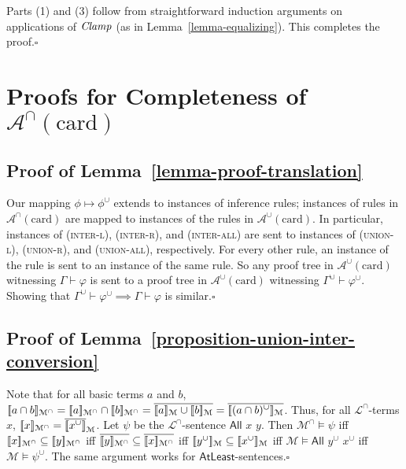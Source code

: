 \documentclass[letterpaper]{article} %
\theoremstyle{definition}
\newcommand{\semantics}[1]{[\![\mbox{\em $ #1 $\/}]\!]}
\newcommand{\Model}{\mathcal{M}}
\newcommand{\proves}{\vdash}
\newcommand{\lang}{\mathcal{L}}
\newcommand{\Aunion}{\mathscr{A}^{\cup}}
\newcommand{\Ainter}{\mathscr{A}^{\cap}}
\newcommand{\proverule}{\textsc}
\newcommand{\unionl}{\proverule{union-l}}
\newcommand{\unionr}{\proverule{union-r}}
\newcommand{\unionall}{\proverule{union-all}}
\newcommand{\interl}{\proverule{inter-l}}
\newcommand{\interr}{\proverule{inter-r}}
\newcommand{\interall}{\proverule{inter-all}}
\newcommand{\All}[2]{\mathsf{All}\,\,#1\,\,#2}
\newcommand{\AtleastNoArgs}{\mathsf{AtLeast}}
\newcommand{\card}{\mathrm{card}}
\newcommand{\Clamp}{\protect{\mbox{\textit{Clamp}}}}
\begin{document}
Parts (1) and (3) follow from straightforward induction arguments on applications of $\Clamp$ (as in Lemma~\ref{lemma-equalizing}).
This completes the proof.\hfill$\square$



\section{Proofs for Completeness of $\Ainter(\card)$}
\label{s:supp:completeness-Aintercard}

\subsection*{Proof of Lemma~\ref{lemma-proof-translation}}

Our mapping $\phi\mapsto\phi^\cup$ extends to instances of inference rules; instances of rules in $\Ainter(\card)$ are mapped to instances of the rules in $\Aunion(\card)$. 
In particular, instances of (\interl), (\interr), and (\interall) are sent to instances of (\unionl), (\unionr), and (\unionall), respectively.  For every other rule, an instance of the rule is sent to an instance of the same rule.  So any proof tree in $\Aunion(\card)$ witnessing $\Gamma \proves \varphi$ is sent to a proof tree in $\Aunion(\card)$ witnessing $\Gamma^\cup \proves \varphi^\cup$.  Showing that $\Gamma^\cup \proves \varphi^\cup \implies \Gamma \proves \varphi$ is similar.\hfill$\square$


\subsection*{Proof of Lemma~\ref{proposition-union-inter-conversion}}

Note that for all basic terms $a$ and $b$, 
$\semantics{a\cap b}_{\Model^\cap} =\semantics{a}_{\Model^\cap}
\cap \semantics{b}_{\Model^\cap}
=  \overline{\semantics{a}_{\Model}
\cup \semantics{b}_{\Model}  }
=  \overline{\semantics{(a\cap b)^{\cup}}_{\Model}  }
$.
Thus, for all $\lang^\cap$-terms $x$, 
$\semantics{x}_{\Model^\cap} = \overline{\semantics{x^\cup}}_{\Model}$.
Let $\psi$ be the $\lang^\cap$-sentence $\All{x}{y}$.
Then 
$\Model^\cap \models \psi$
iff
$\semantics{x}_{\Model^\cap} \subseteq \semantics{y}_{\Model^\cap}$
iff
$\overline{\semantics{y}_{\Model^\cap}} \subseteq \overline{\semantics{x}_{\Model^\cap}}$
iff
$\semantics{y^\cup}_\Model \subseteq \semantics{x^\cup}_\Model$
iff
$\Model\models\All{y^\cup}{x^\cup}$
iff
$\Model\models\psi^\cup$.
The same argument works for $\AtleastNoArgs$-sentences.\hfill$\square$
\end{document}
